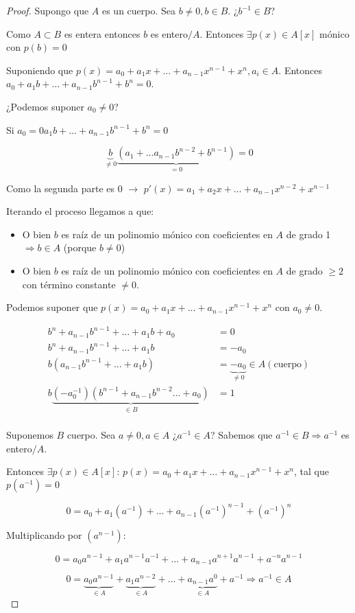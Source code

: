 	\begin{proof}

		\proofpart{$\Rightarrow$}

		Supongo que $A$ es un cuerpo. Sea $b \neq 0, b \in B$. ¿$b^{-1} \in B$?

		Como $A \subset B$ es entera entonces $b$ es entero$/A$. Entonces $\exists p(x) \in A[x]$ mónico con $p(b)=0$

		Suponiendo que $p(x)=a_0 + a_1x + … + a_{n-1}x^{n-1} + x^n, a_i \in A$. Entonces $a_0 + a_1 b + … + a_{n-1}b^{n-1} + b^n = 0$.

		¿Podemos suponer $a_0 \neq 0$?

		Si $a_0 = 0  a_1 b + … + a_{n-1}b^{n-1}+b^{n} = 0$

		\[ \underbrace{b}_{\neq 0} \underbrace{(a_1 + … a_{n-1}b^{n-2} + b^{n-1})}_{=0} = 0\]

		Como la segunda parte es 0 $\rightarrow$ $p'(x) = a_1 + a_2 x + … + a_{n-1}x^{n-2} + x^{n-1}$

		Iterando el proceso llegamos a que:

		\begin{itemize}
			\item O bien $b$ es raíz de un polinomio mónico con coeficientes en $A$ de grado 1 $\Rightarrow b \in A$ (porque $b \neq 0$)

			\item O bien $b$ es raíz de un polinomio mónico con coeficientes en $A$ de grado $\geq 2$ con término constante $\neq 0$.

		\end{itemize}

		Podemos suponer que $p(x) = a_0 + a_1x + … + a_{n-1}x^{n-1} + x^n$ con $a_0 \neq 0$.

		\begin{align*}
		b^n + a_{n-1}b^{n-1}+…+a_1b + a_0 &= 0 \\
		b^n + a_{n-1}b^{n-1}+…+a_1b &= -a_0 \\
		b(a_{n-1}b^{n-1}+…+a_1b) &= \underbrace{-a_0}_{\neq 0} \in A (\text{cuerpo}) \\
		b \underbrace{(-a_0^{-1})(b^{n-1}+a_{n-1}b^{n-2}…+a_0)}_{\in B} &= 1 \\
		\end{align*}

		\proofpart{$\Leftarrow$}

		Suponemos $B$ cuerpo. Sea $a \neq 0,a \in A$ ¿$a^{-1} \in A$? Sabemos que $a^{-1} \in B \Rightarrow a^{-1}$ es entero$/A$.

		Entonces $\exists p(x) \in A[x]$: $p(x) = a_0 + a_1x + … + a_{n-1}x^{n-1} + x^n $, tal que $p(a^{-1})=0$

		\[ 0 = a_0 + a_1(a^{-1}) + … + a_{n-1}(a^{-1})^{n-1} + (a^{-1})^n \]

		Multiplicando por $(a^{n-1})$:

		\[ 0 = a_0 a^{n-1} + a_1 a^{n-1} a^{-1} + … + a_{n-1} a^{n+1} a^{n-1} + a^{-n} a^{n-1} \]

		\[ 0 = \underbrace{a_0 a^{n-1}}_{\in A} + \underbrace{a_1 a^{n-2}}_{\in A} + … + \underbrace{a_{n-1}a^0}_{\in A} + a^{-1} \Rightarrow a^{-1} \in A \]


	\end{proof}

